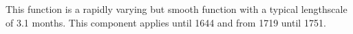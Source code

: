 This function is a rapidly varying but smooth function with a typical lengthscale of 3.1 months.
This component applies until 1644 and from 1719 until 1751.